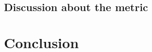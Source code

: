 \documentclass[wcp]{jmlr}
\begin{document}
\subsection{Discussion about the metric}
\label{sec:metric}


\section{Conclusion}



\end{document}
